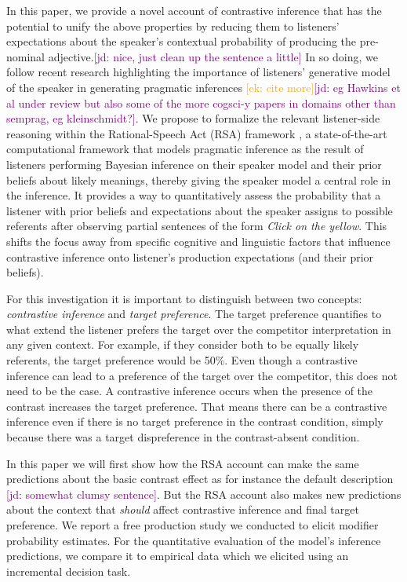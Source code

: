\documentclass[10pt,letterpaper]{article}
\newcommand{\ek}[1]{\textcolor{Orange}{[ek: #1]}}
\newcommand{\jd}[1]{\textcolor{Purple}{[jd: #1]}}
\begin{document}
In this paper, we provide a novel account of contrastive inference that has the potential to unify the above properties by reducing them to listeners' expectations about the speaker's contextual probability of producing the pre-nominal adjective.\jd{nice, just clean up the sentence a little} In so doing, we follow recent research highlighting the importance of listeners' generative model of the speaker in generating pragmatic inferences \cite{Degen:2019}\ek{cite more}\jd{eg Hawkins et al under review but also some of the more cogsci-y papers in domains other than semprag, eg kleinschmidt?}. We propose to formalize the relevant listener-side reasoning within the Rational-Speech Act (RSA) framework \cite{Frank:2012, Goodman:2016}, a state-of-the-art computational framework that models pragmatic inference as the result of listeners performing Bayesian inference on their speaker model and their prior beliefs about likely meanings, thereby giving the speaker model a central role in the inference. It provides a way to quantitatively assess the probability that a listener with prior beliefs and expectations about the speaker assigns to possible referents after observing partial sentences of the form \emph{Click on the yellow}. This shifts the focus away from specific cognitive and linguistic factors that influence contrastive inference onto listener's production expectations (and their prior beliefs). 

For this investigation it is important to distinguish between two concepts: \emph{contrastive inference} and \emph{target preference}. The target preference quantifies to what extend the listener prefers the target over the competitor interpretation in any given context. For example, if they consider both to be equally likely referents, the target preference would be 50\%. Even though a contrastive inference can lead to a preference of the target over the competitor, this does not need to be the case. A contrastive inference occurs when the presence of the contrast increases the target preference. That means there can be a contrastive inference even if there is no target preference in the contrast condition, simply because there was a target dispreference in the contrast-absent condition.

In this paper we will first show how the RSA account can make the same predictions about the basic contrast effect as for instance the default description \cite{Sedivy:2003} \jd{somewhat clumsy sentence}. But the RSA account also makes new predictions about the context that \emph{should} affect contrastive inference and final target preference. We report a free production study we conducted to elicit modifier probability estimates. For the quantitative evaluation of the model's inference predictions, we compare it to empirical data which we elicited using an incremental decision task.
\end{document}
